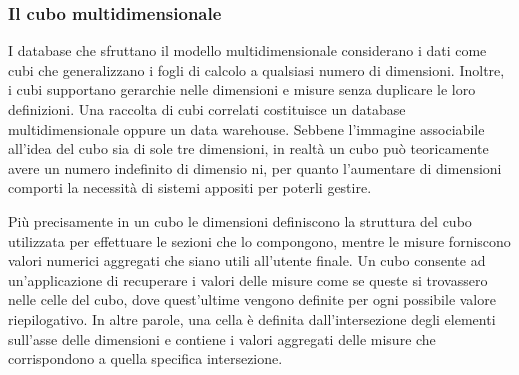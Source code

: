 \subsubsection{Il cubo multidimensionale}

I database che sfruttano il modello multidimensionale considerano i dati come cubi che generalizzano i fogli di calcolo a qualsiasi numero di dimensioni. Inoltre, i cubi supportano gerarchie nelle dimensioni e misure senza duplicare le loro definizioni. Una raccolta di cubi correlati costituisce un database multidimensionale oppure un data warehouse. Sebbene l’immagine associabile all’idea del cubo sia di sole tre dimensioni, in realtà un cubo può teoricamente avere un numero indefinito di dimensio ni, per quanto l’aumentare di dimensioni comporti la necessità di sistemi appositi per poterli gestire.\cite{researchgate_multidimensional_db}

Più precisamente in un cubo le dimensioni definiscono la struttura del cubo utilizzata per effettuare le sezioni che lo compongono, mentre le misure forniscono valori numerici aggregati che siano utili all’utente finale. Un cubo consente ad un’applicazione di recuperare i valori delle misure come se queste si trovassero nelle celle del cubo, dove quest’ultime vengono definite per ogni possibile valore riepilogativo. In altre parole, una cella è definita dall’intersezione degli elementi sull’asse delle dimensioni e contiene i valori aggregati delle misure che corrispondono a quella specifica intersezione.\cite{microsoft_multidimensional_models}

